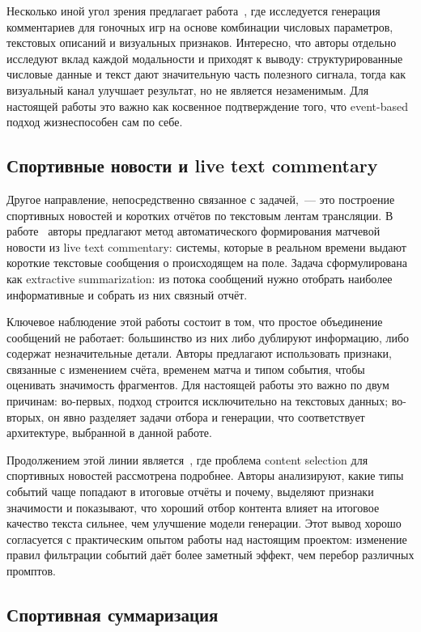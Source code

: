 \documentclass[a4paper,14pt]{extarticle}
\numberwithin{table}{section}
\numberwithin{figure}{section}
\numberwithin{equation}{section}
\begin{document}
Несколько иной угол зрения предлагает работа~\cite{racing}, где исследуется генерация комментариев для гоночных игр на основе комбинации числовых параметров, текстовых описаний и визуальных признаков. Интересно, что авторы отдельно исследуют вклад каждой модальности и приходят к выводу: структурированные числовые данные и текст дают значительную часть полезного сигнала, тогда как визуальный канал улучшает результат, но не является незаменимым. Для настоящей работы это важно как косвенное подтверждение того, что event-based подход жизнеспособен сам по себе.

\subsection{Спортивные новости и live text commentary}

Другое направление, непосредственно связанное с задачей,~--- это построение спортивных новостей и коротких отчётов по текстовым лентам трансляции. В работе~\cite{zhang2016sportsnews} авторы предлагают метод автоматического формирования матчевой новости из live text commentary: системы, которые в реальном времени выдают короткие текстовые сообщения о происходящем на поле. Задача сформулирована как extractive summarization: из потока сообщений нужно отобрать наиболее информативные и собрать из них связный отчёт.

Ключевое наблюдение этой работы состоит в том, что простое объединение сообщений не работает: большинство из них либо дублируют информацию, либо содержат незначительные детали. Авторы предлагают использовать признаки, связанные с изменением счёта, временем матча и типом события, чтобы оценивать значимость фрагментов. Для настоящей работы это важно по двум причинам: во-первых, подход строится исключительно на текстовых данных; во-вторых, он явно разделяет задачи отбора и генерации, что соответствует архитектуре, выбранной в данной работе.

Продолжением этой линии является~\cite{contentselection}, где проблема content selection для спортивных новостей рассмотрена подробнее. Авторы анализируют, какие типы событий чаще попадают в итоговые отчёты и почему, выделяют признаки значимости и показывают, что хороший отбор контента влияет на итоговое качество текста сильнее, чем улучшение модели генерации. Этот вывод хорошо согласуется с практическим опытом работы над настоящим проектом: изменение правил фильтрации событий даёт более заметный эффект, чем перебор различных промптов.

\subsection{Спортивная суммаризация}
\end{document}
